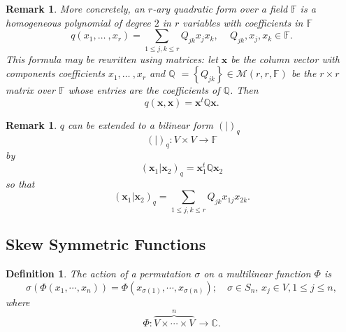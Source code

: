 \documentclass[aps,preprint]{revtex4}%
\newtheorem{definition}[theorem]{Definition}
\newtheorem{remark}[theorem]{Remark}
\begin{document}
\begin{remark}
More concretely, an $r$-ary quadratic form over a field $\mathbb{F}$ is a
homogeneous polynomial of degree $2$ in $r$ variables with coefficients in
$\mathbb{F}$%
\begin{equation}
q(x_{1},\ldots\ ,x_{r})=\sum_{1\leq j,k\leq r}Q_{jk}x_{j}x_{k},\,\quad
Q_{jk},x_{j},x_{k}\in\mathbb{F}.
\end{equation}
This formula may be rewritten using matrices: let\textbf{ }$\mathbf{x}$ be the
column vector with components coefficients $x_{1},\ldots\ ,x_{r}$ and
$\mathbb{Q}$ $=\left\{  Q_{jk}\right\}  \in\mathcal{M}\left(  r,r,\mathbb{F}%
\right)  $ be the $r\times r$ matrix over $\mathbb{F}$ whose entries are the
coefficients of $\mathbb{Q}$. Then%
\begin{equation}
q\left(  \mathbf{x,x}\right)  =\mathbf{x}^{t}\mathbb{Q}\mathbf{x.}%
\end{equation}

\end{remark}

\begin{remark}
$q$ can be extended to a bilinear form $\left(  \left.  {}\right\vert \right)
_{q}$
\begin{equation}
\left(  \left.  {}\right\vert \right)  _{q}:V\times V\rightarrow\mathbb{F}%
\end{equation}
by
\begin{equation}
\left(  \left.  \mathbf{x}_{1}\right\vert \mathbf{x}_{2}\right)
_{q}=\mathbf{x}_{1}^{t}\mathbb{Q}\mathbf{x}_{2}%
\end{equation}
so that
\begin{equation}
\left(  \left.  \mathbf{x}_{1}\right\vert \mathbf{x}_{2}\right)  _{q}%
=\sum_{1\leq j,k\leq r}Q_{jk}x_{1j}x_{2k}.
\end{equation}

\end{remark}

\subsection{Skew Symmetric Functions}

\begin{definition}
The action of a permutation $\sigma$ on a \emph{multilinear} function $\Phi$
is
\begin{equation}
\sigma\left(  \Phi\left(  x_{1},\cdots,x_{n}\right)  \right)  =\Phi\left(
x_{\sigma\left(  1\right)  },\cdots,x_{\sigma\left(  n\right)  }\right)
;\quad\sigma\in S_{n},\,x_{j}\in V,1\leq j\leq n,
\end{equation}
where
\begin{equation}
\Phi:\overset{n}{\overbrace{V\times\cdots\times V}}\,\rightarrow\mathbb{C}.
\end{equation}

\end{definition}
\end{document}
